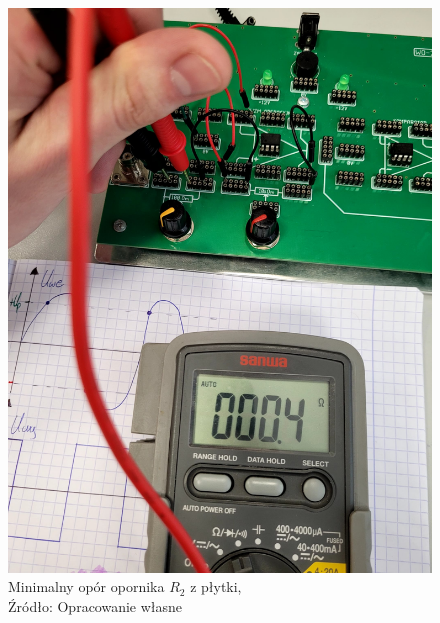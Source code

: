 \documentclass{article}
\begin{document}
\begin{figure}[!ht]
\begin{minipage}{.5\textwidth}
          \includegraphics[scale=0.08]{grafiki/y_min.jpg} 
          \caption{Minimalny opór opornika $R_2$ z płytki,
          \\Źródło: Opracowanie własne}
      \end{minipage}
    \end{figure}
\end{document}
